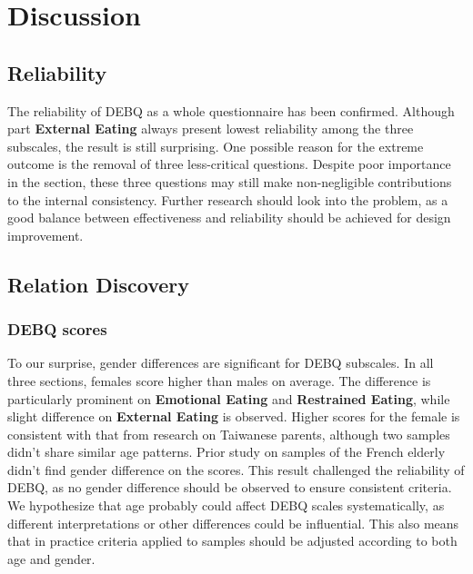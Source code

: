 \documentclass[letterpaper]{article}
\begin{document}
\section{Discussion}
\subsection{Reliability}
The reliability of DEBQ as a whole questionnaire has been confirmed.
Although part \textbf{External Eating} always present lowest reliability among the three subscales\cite{nolan2010emotional,wu2017validation},
the result is still surprising. One possible reason for the extreme outcome is the removal of three less-critical questions.
Despite poor importance in the section, these three questions may still make non-negligible contributions to the internal consistency.
Further research should look into the problem, as a good balance between effectiveness and reliability should be achieved for design improvement.

\subsection{Relation Discovery}
\subsubsection{DEBQ scores}
To our surprise, gender differences are significant for DEBQ subscales. In all three sections, females score higher than males on average.
The difference is particularly prominent on \textbf{Emotional Eating} and \textbf{Restrained Eating},
while slight difference on \textbf{External Eating} is observed. Higher scores for the female is consistent with that from
research on Taiwanese parents\cite{wang2018psychometric}, although two samples didn't share similar age patterns.
Prior study on samples of the French elderly didn't find gender difference on the scores\cite{bailly2012dutch}.
This result challenged the reliability of DEBQ, as no gender difference should be observed to ensure consistent criteria.
We hypothesize that age probably could affect DEBQ scales systematically, as different interpretations or other differences could be influential.
This also means that in practice criteria applied to samples should be adjusted according to both age and gender. 
\end{document}
